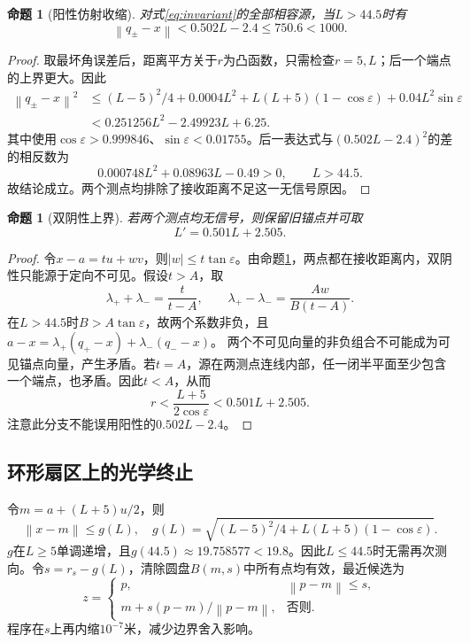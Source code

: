 \documentclass[UTF8,a4paper,zihao=-4,fontset=windows]{ctexart}
\newtheorem{proposition}[theorem]{命题}
\newcommand{\norm}[1]{\left\lVert#1\right\rVert}
\begin{document}
\begin{proposition}[阳性仿射收缩]\label{prop:range}
对式\eqref{eq:invariant}的全部相容源，当$L>44.5$时有
\begin{equation}\norm{q_\pm-x}<0.502L-2.4\le750.6<1000.\end{equation}
\end{proposition}
\begin{proof}
取最坏角误差后，距离平方关于$r$为凸函数，只需检查$r=5,L$；后一个端点的上界更大。因此
\begin{align}
\norm{q_\pm-x}^2
&\le (L-5)^2/4+0.0004L^2+L(L+5)(1-\cos\varepsilon)+0.04L^2\sin\varepsilon\\
&<0.251256L^2-2.49923L+6.25.
\end{align}
其中使用$\cos\varepsilon>0.999846$、$\sin\varepsilon<0.01755$。后一表达式与$(0.502L-2.4)^2$的差的相反数为
\begin{equation}0.000748L^2+0.08963L-0.49>0,\qquad L>44.5.\end{equation}
故结论成立。两个测点均排除了接收距离不足这一无信号原因。
\end{proof}

\begin{proposition}[双阴性上界]\label{prop:negative}
若两个测点均无信号，则保留旧锚点并可取
\begin{equation}L'=0.501L+2.505.\end{equation}
\end{proposition}
\begin{proof}
令$x-a=tu+wv$，则$|w|\le t\tan\varepsilon$。由命题\ref{prop:range}，两点都在接收距离内，双阴性只能源于定向不可见。假设$t>A$，取
\begin{equation}
\lambda_++\lambda_-=\frac{t}{t-A},\qquad
\lambda_+-\lambda_-=\frac{Aw}{B(t-A)}.
\end{equation}
在$L>44.5$时$B>A\tan\varepsilon$，故两个系数非负，且
$a-x=\lambda_+(q_+-x)+\lambda_-(q_--x)$。
两个不可见向量的非负组合不可能成为可见锚点向量，产生矛盾。若$t=A$，源在两测点连线内部，任一闭半平面至少包含一个端点，也矛盾。因此$t<A$，从而
\begin{equation}
r<\frac{L+5}{2\cos\varepsilon}<0.501L+2.505.
\end{equation}
注意此分支不能误用阳性的$0.502L-2.4$。
\end{proof}

\subsection{环形扇区上的光学终止}
令$m=a+(L+5)u/2$，则
\begin{equation}\label{eq:annularradius}
\norm{x-m}\le g(L),\quad
g(L)=\sqrt{(L-5)^2/4+L(L+5)(1-\cos\varepsilon)}.
\end{equation}
$g$在$L\ge5$单调递增，且$g(44.5)\approx19.758577<19.8$。因此$L\le44.5$时无需再次测向。令$s=r_s-g(L)$，清除圆盘$B(m,s)$中所有点均有效，最近候选为
\begin{equation}\label{eq:terminal}
z=\begin{cases}p,&\norm{p-m}\le s,\\m+s(p-m)/\norm{p-m},&\text{否则}.\end{cases}
\end{equation}
程序在$s$上再内缩$10^{-7}$米，减少边界舍入影响。
\end{document}
